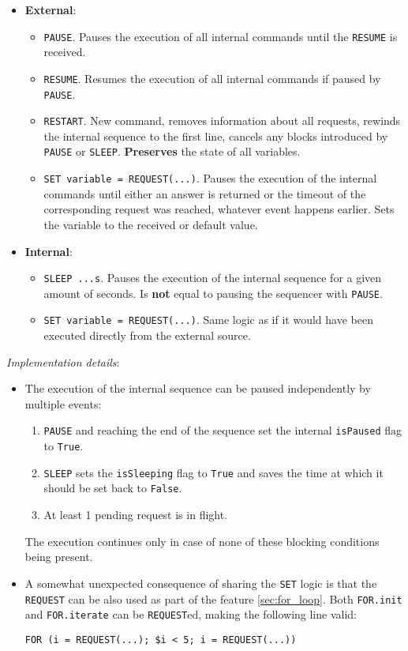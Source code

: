 \begin{itemize}
	\item \textbf{External}:
	\begin{itemize}
		\item \texttt{PAUSE}. Pauses the execution of all internal commands until the \texttt{RESUME} is received.
		\item \texttt{RESUME}. Resumes the execution of all internal commands if paused by \texttt{PAUSE}.
		\item \texttt{RESTART}. New command, removes information about all requests, rewinds the internal sequence to the first line, cancels any blocks introduced by \texttt{PAUSE} or \texttt{SLEEP}. \textbf{Preserves} the state of all variables.
		\item \texttt{SET variable = REQUEST(...)}. Pauses the execution of the internal commands until either an answer is returned or the timeout of the corresponding request was reached, whatever event happens earlier. Sets the variable to the received or default value.
	\end{itemize}
	\item \textbf{Internal}:
	\begin{itemize}
		\item \texttt{SLEEP ...s}. Pauses the execution of the internal sequence for a given amount of seconds. Is \textbf{not} equal to pausing the sequencer with \texttt{PAUSE}.
		\item \texttt{SET variable = REQUEST(...)}. Same logic as if it would have been executed directly from the external source.
	\end{itemize}
\end{itemize}

\newpage

\textit{Implementation details}:

\begin{itemize}
	\item{
		The execution of the internal sequence can be paused independently by multiple events:
		\begin{enumerate}
			\item \texttt{PAUSE} and reaching the end of the sequence set the internal \texttt{isPaused} flag to \texttt{True}.
			\item \texttt{SLEEP} sets the \texttt{isSleeping} flag to \texttt{True} and saves the time at which it should be set back to \texttt{False}.
			\item At least 1 pending request is in flight.
		\end{enumerate}
		The execution continues only in case of none of these blocking conditions being present.
	}
	\item{
		A somewhat unexpected consequence of sharing the \texttt{SET} logic is that the \texttt{REQUEST} can be also used as part of the feature \ref{sec:for_loop}. Both \texttt{FOR.init} and \texttt{FOR.iterate} can be \texttt{REQUEST}ed, making the following line valid:
\begin{lstlisting}[language=n2EDMScript, numbers=none]
FOR (i = REQUEST(...); $i < 5; i = REQUEST(...))
\end{lstlisting}
	}
\end{itemize}

